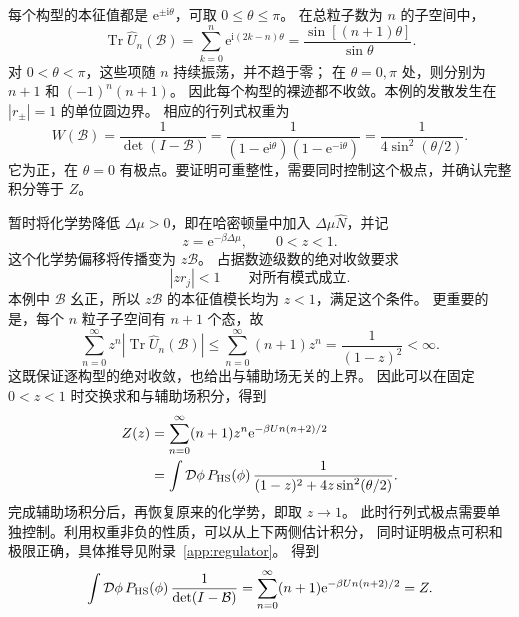 \documentclass[UTF8,11pt,a4paper,fontset=fandol]{ctexart}
\newcommand{\Tr}{\operatorname{Tr}}
\newcommand{\ee}{\mathrm e}
\newcommand{\ii}{\mathrm i}
\numberwithin{equation}{section}
\begin{document}
每个构型的本征值都是 $\ee^{\pm\ii\theta}$，可取 $0\le\theta\le\pi$。
在总粒子数为 $n$ 的子空间中，
\begin{equation}
 \Tr\hat U_n(\mathcal B)
 =\sum_{k=0}^n\ee^{\ii(2k-n)\theta}
 =\frac{\sin[(n+1)\theta]}{\sin\theta}.
 \label{eq:character}
\end{equation}
对 $0<\theta<\pi$，这些项随 $n$ 持续振荡，并不趋于零；
在 $\theta=0,\pi$ 处，则分别为 $n+1$ 和 $(-1)^n(n+1)$。
因此每个构型的裸迹都不收敛。本例的发散发生在 $|r_\pm|=1$ 的单位圆边界。
相应的行列式权重为
\begin{equation}
 W(\mathcal B)=\frac1{\det(I-\mathcal B)}
 =\frac1{(1-\ee^{\ii\theta})(1-\ee^{-\ii\theta})}
 =\frac1{4\sin^2(\theta/2)}.
 \label{eq:spinW}
\end{equation}
它为正，在 $\theta=0$ 有极点。要证明可重整性，需要同时控制这个极点，并确认完整积分等于 $Z$。

暂时将化学势降低 $\Delta\mu>0$，即在哈密顿量中加入 $\Delta\mu\hat N$，并记
\begin{equation}
 z=\ee^{-\beta\Delta\mu},\qquad 0<z<1.
\end{equation}
这个化学势偏移将传播变为 $z\mathcal B$。
占据数迹级数的绝对收敛要求
\begin{equation}
 |zr_j|<1\qquad\text{对所有模式成立}.
 \label{eq:z_convergence_condition}
\end{equation}
本例中 $\mathcal B$ 幺正，所以 $z\mathcal B$ 的本征值模长均为 $z<1$，满足这个条件。
更重要的是，每个 $n$ 粒子子空间有 $n+1$ 个态，故
\begin{equation}
 \sum_{n=0}^{\infty}z^n
 \left|\Tr\hat U_n(\mathcal B)\right|
 \le\sum_{n=0}^{\infty}(n+1)z^n
 =\frac1{(1-z)^2}<\infty.
 \label{eq:atom_uniform_convergence}
\end{equation}
这既保证逐构型的绝对收敛，也给出与辅助场无关的上界。
因此可以在固定 $0<z<1$ 时交换求和与辅助场积分，得到
\begin{align}
 Z(z)&=\sum_{n=0}^{\infty}(n+1)z^n\ee^{-\beta U n(n+2)/2}
 \nonumber\\
 &=\int\mathcal D\phi\,P_{\rm HS}(\phi)\,
   \frac1{(1-z)^2+4z\sin^2(\theta/2)}.
 \label{eq:spinregulator}
\end{align}
完成辅助场积分后，再恢复原来的化学势，即取 $z\to1$。
此时行列式极点需要单独控制。利用权重非负的性质，可以从上下两侧估计积分，
同时证明极点可积和极限正确，具体推导见附录~\ref{app:regulator}。
得到
\begin{equation}
 \int\mathcal D\phi\,P_{\rm HS}(\phi)\,
 \frac1{\det(I-\mathcal B)}
 =\sum_{n=0}^{\infty}(n+1)\ee^{-\beta U n(n+2)/2}
 =Z.
 \label{eq:exactZ}
\end{equation}
\end{document}

